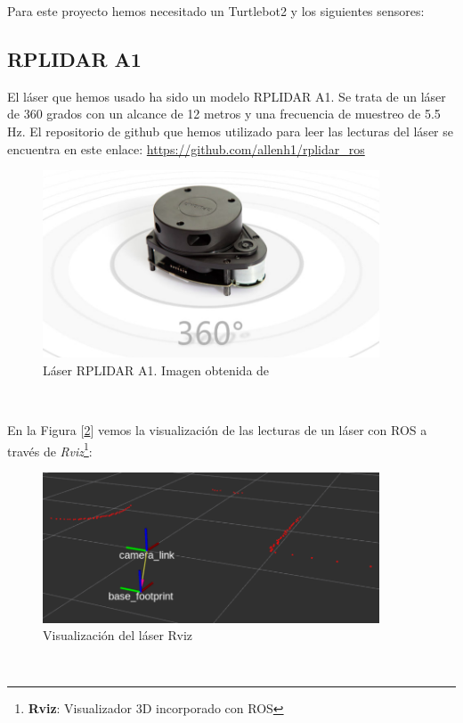 Para este proyecto hemos necesitado un Turtlebot2 y los siguientes sensores:
\subsection{RPLIDAR A1}
\label{subsec:rplidar_a1}
El láser que hemos usado ha sido un modelo RPLIDAR A1. Se trata de un láser de 360 grados con un alcance de 12 metros y una frecuencia de muestreo de 5.5 Hz. El repositorio de github que hemos utilizado para leer las lecturas del láser se encuentra en este enlace: \url{https://github.com/allenh1/rplidar_ros}\\

\begin{figure} [H]
  \begin{center}
    \includegraphics[width=10cm]{imagenes/cap3/rplidar-a1.png}
  \end{center}
  \caption[Láser RPLIDAR A1]{Láser RPLIDAR A1. Imagen obtenida de \cite{rplidar_a1}}
  \label{fig:rplidar_a1}
\end{figure}\

En la Figura [\ref{fig:laser_rviz}] vemos la visualización de las lecturas de un láser con ROS a través de \textit{Rviz}\footnote{\textbf{Rviz}: Visualizador 3D incorporado con ROS}:\\

\begin{figure} [H]
  \begin{center}
    \includegraphics[width=10cm]{imagenes/cap3/laser-rviz.png}
  \end{center}
  \caption[Visualización del láser en Rviz]{Visualización del láser Rviz}
  \label{fig:laser_rviz}
\end{figure}\

